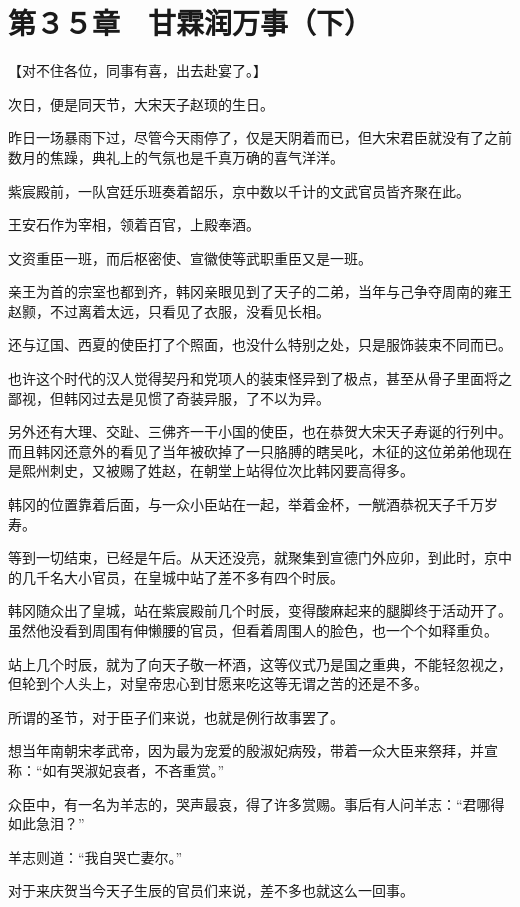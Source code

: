 \section{第３５章　甘霖润万事（下）}

【对不住各位，同事有喜，出去赴宴了。】

次日，便是同天节，大宋天子赵顼的生日。

昨日一场暴雨下过，尽管今天雨停了，仅是天阴着而已，但大宋君臣就没有了之前数月的焦躁，典礼上的气氛也是千真万确的喜气洋洋。

紫宸殿前，一队宫廷乐班奏着韶乐，京中数以千计的文武官员皆齐聚在此。

王安石作为宰相，领着百官，上殿奉酒。

文资重臣一班，而后枢密使、宣徽使等武职重臣又是一班。

亲王为首的宗室也都到齐，韩冈亲眼见到了天子的二弟，当年与己争夺周南的雍王赵颢，不过离着太远，只看见了衣服，没看见长相。

还与辽国、西夏的使臣打了个照面，也没什么特别之处，只是服饰装束不同而已。

也许这个时代的汉人觉得契丹和党项人的装束怪异到了极点，甚至从骨子里面将之鄙视，但韩冈过去是见惯了奇装异服，了不以为异。

另外还有大理、交趾、三佛齐一干小国的使臣，也在恭贺大宋天子寿诞的行列中。而且韩冈还意外的看见了当年被砍掉了一只胳膊的瞎吴叱，木征的这位弟弟他现在是熙州刺史，又被赐了姓赵，在朝堂上站得位次比韩冈要高得多。

韩冈的位置靠着后面，与一众小臣站在一起，举着金杯，一觥酒恭祝天子千万岁寿。

等到一切结束，已经是午后。从天还没亮，就聚集到宣德门外应卯，到此时，京中的几千名大小官员，在皇城中站了差不多有四个时辰。

韩冈随众出了皇城，站在紫宸殿前几个时辰，变得酸麻起来的腿脚终于活动开了。虽然他没看到周围有伸懒腰的官员，但看着周围人的脸色，也一个个如释重负。

站上几个时辰，就为了向天子敬一杯酒，这等仪式乃是国之重典，不能轻忽视之，但轮到个人头上，对皇帝忠心到甘愿来吃这等无谓之苦的还是不多。

所谓的圣节，对于臣子们来说，也就是例行故事罢了。

想当年南朝宋孝武帝，因为最为宠爱的殷淑妃病殁，带着一众大臣来祭拜，并宣称：“如有哭淑妃哀者，不吝重赏。”

众臣中，有一名为羊志的，哭声最哀，得了许多赏赐。事后有人问羊志：“君哪得如此急泪？”

羊志则道：“我自哭亡妻尔。”

对于来庆贺当今天子生辰的官员们来说，差不多也就这么一回事。

